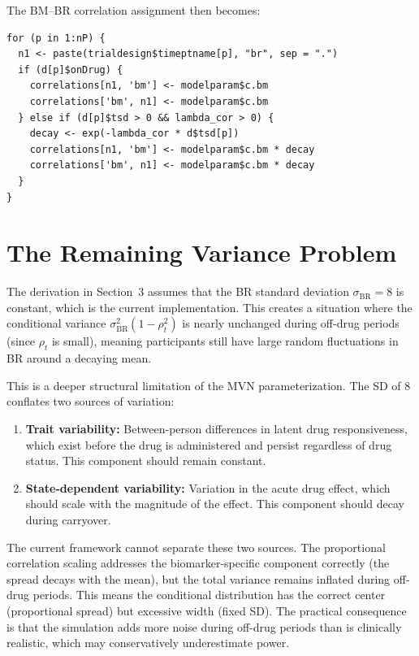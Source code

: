 \documentclass[11pt]{article}
\begin{document}
The BM--BR correlation assignment then becomes:

\begin{verbatim}
for (p in 1:nP) {
  n1 <- paste(trialdesign$timeptname[p], "br", sep = ".")
  if (d[p]$onDrug) {
    correlations[n1, 'bm'] <- modelparam$c.bm
    correlations['bm', n1] <- modelparam$c.bm
  } else if (d[p]$tsd > 0 && lambda_cor > 0) {
    decay <- exp(-lambda_cor * d$tsd[p])
    correlations[n1, 'bm'] <- modelparam$c.bm * decay
    correlations['bm', n1] <- modelparam$c.bm * decay
  }
}
\end{verbatim}

\section{The Remaining Variance Problem}

The derivation in Section~3 assumes that the BR standard
deviation $\sigma_{\text{BR}} = 8$ is constant, which is
the current implementation. This creates a situation where
the conditional variance
$\sigma_{\text{BR}}^2 (1 - \rho_t^2)$ is nearly unchanged
during off-drug periods (since $\rho_t$ is small), meaning
participants still have large random fluctuations in BR
around a decaying mean.

This is a deeper structural limitation of the MVN
parameterization. The SD of 8 conflates two sources of
variation:

\begin{enumerate}
\item \textbf{Trait variability:} Between-person differences
  in latent drug responsiveness, which exist before the drug
  is administered and persist regardless of drug status. This
  component should remain constant.

\item \textbf{State-dependent variability:} Variation in
  the acute drug effect, which should scale with the
  magnitude of the effect. This component should decay during
  carryover.
\end{enumerate}

The current framework cannot separate these two sources.
The proportional correlation scaling addresses the
biomarker-specific component correctly (the spread decays
with the mean), but the total variance remains inflated
during off-drug periods. This means the conditional
distribution has the correct center (proportional spread)
but excessive width (fixed SD). The practical consequence
is that the simulation adds more noise during off-drug
periods than is clinically realistic, which may
conservatively underestimate power.
\end{document}
